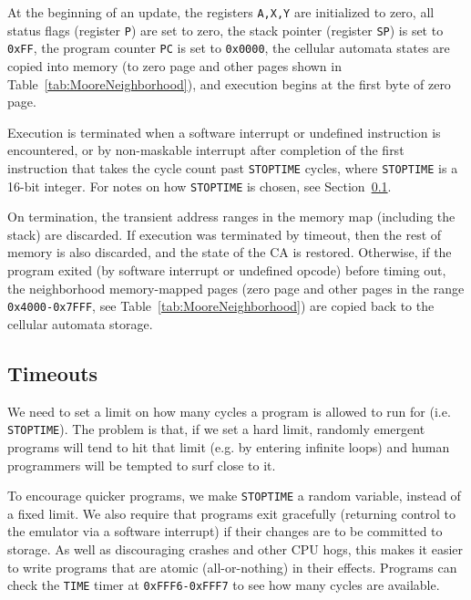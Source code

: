 \documentclass{article}
\newcommand\code[1]{{\tt #1}}
\newcommand\hex[1]{{\tt 0x#1}}
\newcommand\hexrange[2]{\hex{#1}{\tt -}\hex{#2}}
\begin{document}
At the beginning of an update,
the registers \code{A,X,Y} are initialized to zero,
all status flags (register \code{P}) are set to zero,
the stack pointer (register \code{SP}) is set to \hex{FF},
the program counter \code{PC} is set to \hex{0000},
the cellular automata states are copied into memory (to zero page and other pages shown in Table~\ref{tab:MooreNeighborhood}),
and execution begins at the first byte of zero page.

Execution is terminated
when a software interrupt or undefined instruction is encountered,
or by non-maskable interrupt after completion of the first instruction that takes the cycle count past \code{STOPTIME} cycles,
where \code{STOPTIME} is a 16-bit integer.
For notes on how \code{STOPTIME} is chosen, see Section~\ref{sec:Timeouts}.

On termination, the transient address ranges in the memory map
(including the stack) are discarded.
If execution was terminated by timeout, then the rest of memory is also discarded,
and the state of the CA is restored.
Otherwise, if the program exited (by software interrupt or undefined opcode) before timing out,
the neighborhood memory-mapped pages (zero page and other pages in the range \hexrange{4000}{7FFF}, see Table~\ref{tab:MooreNeighborhood})
are copied back to the cellular automata storage.

\subsection{Timeouts}
\label{sec:Timeouts}

We need to set a limit on how many cycles a program is allowed to run for (i.e. \code{STOPTIME}).
The problem is that, if we set a hard limit, randomly emergent programs will tend to hit that limit
(e.g. by entering infinite loops)
and human programmers will be tempted to surf close to it.

To encourage quicker programs,
we make \code{STOPTIME} a random variable, instead of a fixed limit.
We also require that programs exit gracefully (returning control to the emulator via a software interrupt)
if their changes are to be committed to storage.
As well as discouraging crashes and other CPU hogs, this makes it easier to write programs that are atomic (all-or-nothing) in their effects.
Programs can check the \code{TIME} timer at \hexrange{FFF6}{FFF7} to see how many cycles are available.
\end{document}
